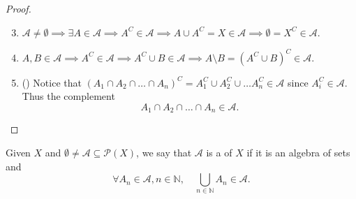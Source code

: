 \documentclass[notoc,notitlepage]{tufte-book}
\begin{document}
\begin{proof}
  \begin{enumerate}
    \setcounter{enumi}{2}
    \item $\mathcal{A} \neq \emptyset \implies \exists A \in \mathcal{A}
      \implies A^C \in \mathcal{A} \implies A \cup A^C = X \in \mathcal{A}
      \implies \emptyset = X^C \in \mathcal{A}$.
    \item $A, B \in \mathcal{A} \implies A^C \in \mathcal{A}
      \implies A^C \cup B \in \mathcal{A}
      \implies A \setminus B = (A^C \cup B)^C \in \mathcal{A}$.
    \item ()
      Notice that
      $(A_1 \cap A_2 \cap \hdots \cap A_n)^C
      = A_1^C \cup A_2^C \cup \hdots A_n^C \in \mathcal{A}$
      since $A_i^C \in \mathcal{A}$.
      Thus the complement
      \begin{equation*}
        A_1 \cap A_2 \cap \hdots \cap A_n \in \mathcal{A}.
      \end{equation*}
  \end{enumerate}
\end{proof}

\begin{defn}\label{defn:_sigma_algebra_of_sets}
  Given $X$ and $\emptyset \neq \mathcal{A} \subseteq \mathcal{P}(X)$,
  we say that $\mathcal{A}$ is a 
  of $X$ if it is an algebra of sets and
  \begin{equation*}
    \forall A_n \in \mathcal{A}, n \in \mathbb{N}, \quad
    \bigcup_{n \in \mathbb{N}} A_n \in \mathcal{A}.
  \end{equation*}
\end{defn}
\end{document}
